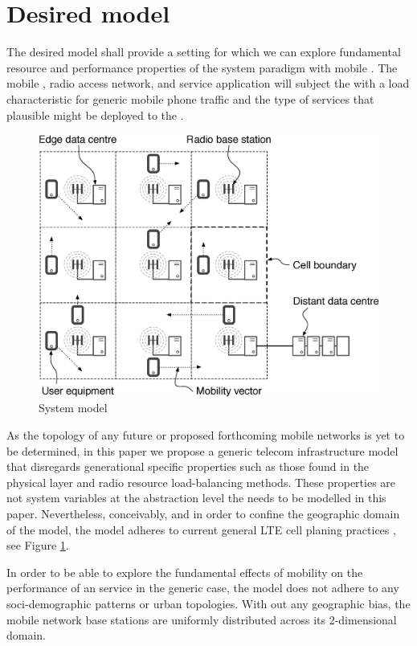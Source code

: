 \section{Desired model}
\label{sec:desiard_model}

The desired model shall provide a setting for which we can explore fundamental resource and performance properties of the \xcloud{} system paradigm with mobile \ues{}. The mobile \ues{}, radio access network, and service application will subject the \dcs{} with a load characteristic for generic mobile phone traffic and the type of services that plausible might be deployed to the \xcloud{}.

\begin{figure}[tb]
	\centering
	\includegraphics[width=\linewidth]{fig_system_model.eps} 
	\caption{System model}
	\label{fig:system_model}
\end{figure}

As the topology of any future \xcloud{} or proposed forthcoming mobile networks is yet to be determined, in this paper we propose a generic telecom infrastructure model that disregards generational specific properties such as those found in the physical layer and radio resource load-balancing methods. These properties are not system variables at the abstraction level the \xcloud needs to be modelled in this paper. Nevertheless, conceivably, and in order to confine the geographic domain of the model, the model adheres to current general LTE cell planing practices \cite{salo2010practical}, see Figure \ref{fig:system_model}.

In order to be able to explore the fundamental effects of mobility on the performance of an \xcloud service in the generic case, the model does not adhere to any soci-demographic patterns or urban topologies. With out any geographic bias, the mobile network base stations are uniformly distributed across its 2-dimensional domain.

